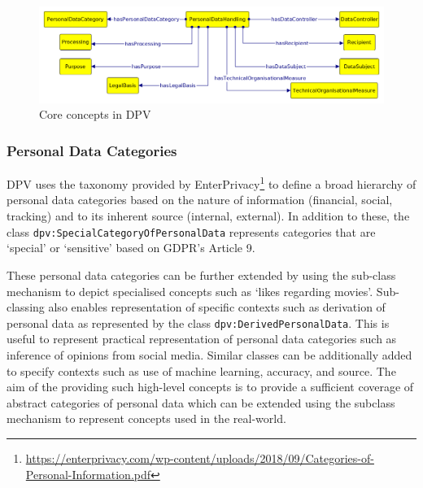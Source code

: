 \begin{figure}[htbp]
    \centering
    \includegraphics[width=\linewidth]{img/dpv-personaldatahandling.png}
    \caption{Core concepts in DPV \cite{pandit_creating_2019}}
    \label{fig:vocabs:dpv-core}
\end{figure}

\subsubsection{Personal Data Categories}
DPV uses the taxonomy provided by EnterPrivacy\footnote{\url{https://enterprivacy.com/wp-content/uploads/2018/09/Categories-of-Personal-Information.pdf}} to define a broad hierarchy of personal data categories based on the nature of information (financial, social, tracking) and to its inherent source (internal, external). 
In addition to these, the class \texttt{dpv:Special\-Category\-Of\-PersonalData} represents categories that are `special' or `sensitive' based on GDPR’s Article 9.

These personal data categories can be further extended by using the sub-class mechanism to depict specialised concepts such as `likes regarding movies'.
Sub-classing also enables representation of specific contexts such as derivation of personal data as represented by the class \texttt{dpv:DerivedPersonalData}.
This is useful to represent practical representation of personal data categories such as inference of opinions from social media.
Similar classes can be additionally added to specify contexts such as use of machine learning, accuracy, and source.
The aim of the providing such high-level concepts is to provide a sufficient coverage of abstract categories of personal data which can be extended using the subclass mechanism to represent concepts used in the real-world. 

